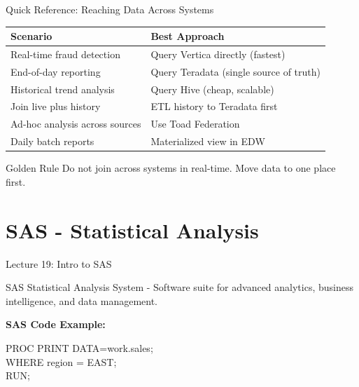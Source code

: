\documentclass{beamer}
\begin{document}
	
	\begin{frame}{Quick Reference: Reaching Data Across Systems}
		\begin{table}
			\small
			\begin{tabular}{|p{}|p{}|}
				\hline
				\textbf{Scenario} & \textbf{Best Approach} \\
				\hline
				Real-time fraud detection & Query Vertica directly (fastest) \\
				\hline
				End-of-day reporting & Query Teradata (single source of truth) \\
				\hline
				Historical trend analysis & Query Hive (cheap, scalable) \\
				\hline
				Join live plus history & ETL history to Teradata first \\
				\hline
				Ad-hoc analysis across sources & Use Toad Federation \\
				\hline
				Daily batch reports & Materialized view in EDW \\
				\hline
			\end{tabular}
		\end{table}
		
		\begin{alertblock}{Golden Rule}
			Do not join across systems in real-time. Move data to one place first.
		\end{alertblock}
	\end{frame}
	
	
	
	\section{SAS - Statistical Analysis}
	
	\begin{frame}{Lecture 19: Intro to SAS}
		\begin{definition}{SAS}
			Statistical Analysis System - Software suite for advanced analytics, business intelligence, and data management.
		\end{definition}
		
		\textbf{SAS Code Example:}
		\begin{center}
			\color{blue}
			PROC PRINT DATA=work.sales;\\
			WHERE region = EAST;\\
			RUN;
			\color{black}
		\end{center}
	\end{frame}
	
\end{document}
